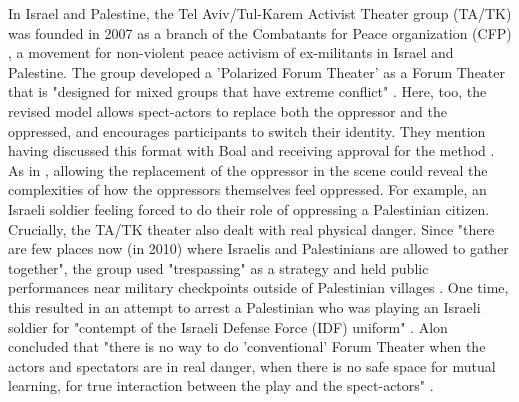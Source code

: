 \documentclass[dissertation,math,vertlayout,pdfa,colorlinks]{aaltoseries}
\begin{document}
In Israel and Palestine, the Tel Aviv/Tul-Karem Activist Theater group (TA/TK) was founded in 2007 as a branch of the Combatants for Peace organization (CFP) \cite{alonCHAPTERFOURTEENNonViolent2011}, a movement for non-violent peace activism of ex-militants in Israel and Palestine. The group developed a 'Polarized Forum Theater' as a Forum Theater that is "designed for mixed groups that have extreme conflict" \cite[p. 167]{alonCHAPTERFOURTEENNonViolent2011}. Here, too, the revised model allows spect-actors to replace both the oppressor and the oppressed, and encourages participants to switch their identity. They mention having discussed this format with Boal and receiving approval for the method \cite[p. 167]{alonCHAPTERFOURTEENNonViolent2011}. As in \cite{miramontiForumTheatreReconciliation2025}, allowing the replacement of the oppressor in the scene could reveal the complexities of how the oppressors themselves feel oppressed. For example, an Israeli soldier feeling forced to do their role of oppressing a Palestinian citizen. Crucially, the TA/TK theater also dealt with real physical danger. Since "there are few places now (in 2010) where Israelis and Palestinians are allowed to gather together", the group used "trespassing" as a strategy and held public performances near military checkpoints outside of Palestinian villages \cite[p. 170]{alonCHAPTERFOURTEENNonViolent2011}. One time, this resulted in an attempt to arrest a Palestinian who was playing an Israeli soldier for "contempt of the Israeli Defense Force (IDF) uniform" \cite[p. 171]{alonCHAPTERFOURTEENNonViolent2011}. Alon concluded that "there is no way to do 'conventional' Forum Theater when the actors and spectators are in real danger, when there is no safe space for mutual learning, for true interaction between the play and the spect-actors" \cite[p. 172]{alonCHAPTERFOURTEENNonViolent2011}.
\end{document}
